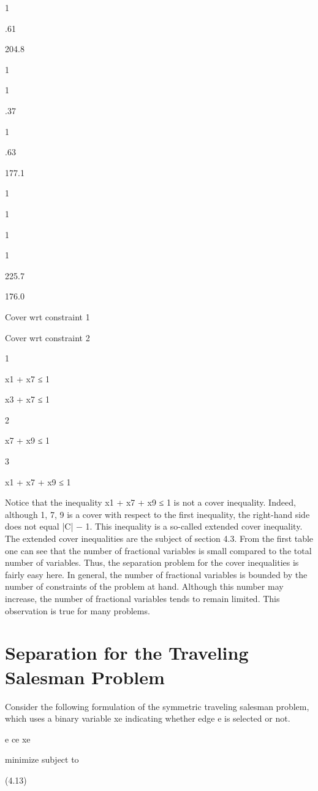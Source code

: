 \begin{example}
1

.61

204.8

1

1

.37

1

.63

177.1

1

1

1

1

225.7

176.0

Cover wrt constraint 1

Cover wrt constraint 2

1

x1 + x7 ≤ 1

x3 + x7 ≤ 1

2

x7 + x9 ≤ 1

3

x1 + x7 + x9 ≤ 1

Notice that the inequality x1 + x7 + x9 ≤ 1 is not a cover inequality. Indeed, although {1, 7, 9} is a
cover with respect to the first inequality, the right-hand side does not equal |C| − 1. This inequality is a
so-called extended cover inequality. The extended cover inequalities are the subject of section 4.3.
From the first table one can see that the number of fractional variables is small compared to the total
number of variables. Thus, the separation problem for the cover inequalities is fairly easy here. In
general, the number of fractional variables is bounded by the number of constraints of the problem at
hand. Although this number may increase, the number of fractional variables tends to remain limited.
This observation is true for many problems.
\end{example}


\section{Separation for the Traveling Salesman Problem}

Consider the following formulation of the symmetric traveling salesman problem, which uses a binary
variable xe indicating whether edge e is selected or not.

e ce xe

minimize
subject to

(4.13)


